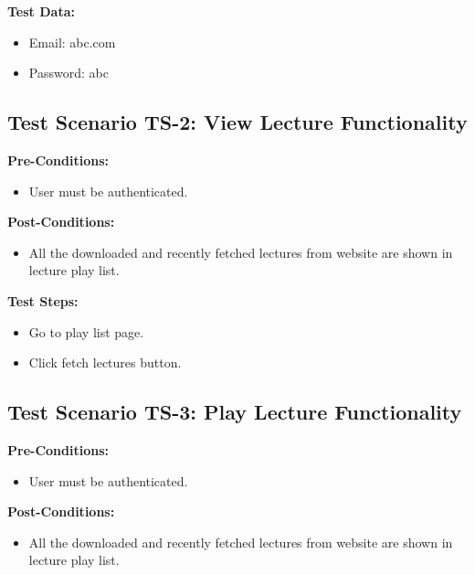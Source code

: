 \textbf{Test Data:}
\begin{itemize}

\item Email: abc.com
\item Password: abc

\end{itemize}



\subsection{Test Scenario TS-2: View Lecture Functionality}

\textbf{Pre-Conditions: }
\begin{itemize}

\item User must be authenticated.

\end{itemize}


\textbf{Post-Conditions: }
\begin{itemize}

\item All the downloaded and recently fetched lectures from website are shown in lecture play list.

\end{itemize}


\textbf{Test Steps:}
\begin{itemize}

\item Go to play list page.
\item Click fetch lectures button.

\end{itemize}



\subsection{Test Scenario TS-3: Play Lecture Functionality}

\textbf{Pre-Conditions: }
\begin{itemize}

\item User must be authenticated.

\end{itemize}


\textbf{Post-Conditions: }
\begin{itemize}

\item All the downloaded and recently fetched lectures from website are shown in lecture play list.

\end{itemize}


